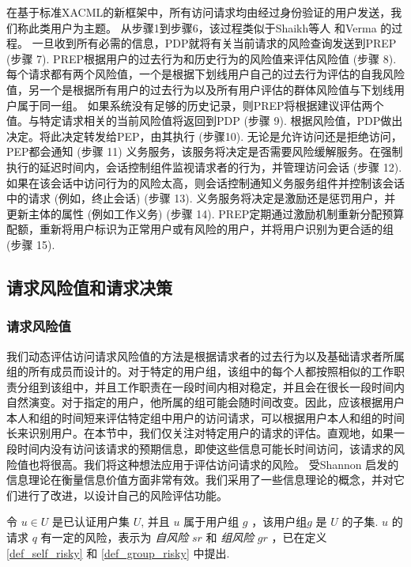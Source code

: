 在基于标准XACML的新框架中，所有访问请求均由经过身份验证的用户发送，我们称此类用户为主题。 从步骤1到步骤6，该过程类似于Shaikh等人\cite{shaikh2012dynamic} 和Verma \cite{verma2004xml}的过程。  一旦收到所有必需的信息，PDP就将有关当前请求的风险查询发送到PREP (步骤 7). PREP根据用户的过去行为和历史行为的风险值来评估风险值 (步骤 8). 每个请求都有两个风险值，一个是根据下划线用户自己的过去行为评估的自我风险值，另一个是根据所有用户的过去行为以及所有用户评估的群体风险值与下划线用户属于同一组。
如果系统没有足够的历史记录，则PREP将根据建议评估两个值。与特定请求相关的当前风险值将返回到PDP (步骤 9). 根据风险值，PDP做出决定。将此决定转发给PEP，由其执行 (步骤10). 无论是允许访问还是拒绝访问，PEP都会通知 (步骤 11) 义务服务，该服务将决定是否需要风险缓解服务。在强制执行的延迟时间内，会话控制组件监视请求者的行为，并管理访问会话 (步骤 12). 如果在该会话中访问行为的风险太高，则会话控制通知义务服务组件并控制该会话中的请求 (例如，终止会话) (步骤 13). 义务服务将决定是激励还是惩罚用户，并更新主体的属性 (例如工作义务) (步骤 14). PREP定期通过激励机制重新分配预算配额，重新将用户标识为正常用户或有风险的用户，并将用户识别为更合适的组 (步骤 15).

\subsection{请求风险值和请求决策}
\label{subsec:risk values and decision}
\subsubsection{请求风险值}
我们动态评估访问请求风险值的方法是根据请求者的过去行为以及基础请求者所属组的所有成员而设计的。对于特定的用户组，该组中的每个人都按照相似的工作职责分组到该组中，并且工作职责在一段时间内相对稳定，并且会在很长一段时间内自然演变。对于指定的用户，他所属的组可能会随时间改变。因此，应该根据用户本人和组的时间短来评估特定组中用户的访问请求，可以根据用户本人和组的时间长来识别用户。在本节中，我们仅关注对特定用户的请求的评估。直观地，如果一段时间内没有访问该请求的预期信息，即使这些信息可能长时间访问，该请求的风险值也将很高。我们将这种想法应用于评估访问请求的风险。
受Shannon \cite{shannon1948mathematical} 启发的信息理论在衡量信息价值方面非常有效。我们采用了一些信息理论的概念，并对它们进行了改进，以设计自己的风险评估功能。

令 $u \in U$ 是已认证用户集 $U$, 并且 $u$ 属于用户组 $g$ ，该用户组$g$ 是 $U$ 的子集. $u$ 的请求 $q$ 有一定的风险，表示为 \emph{自风险} $sr$ 和 \emph{组风险} $gr$ ，已在定义 \ref{def_self_risky} 和 \ref{def_group_risky} 中提出.


